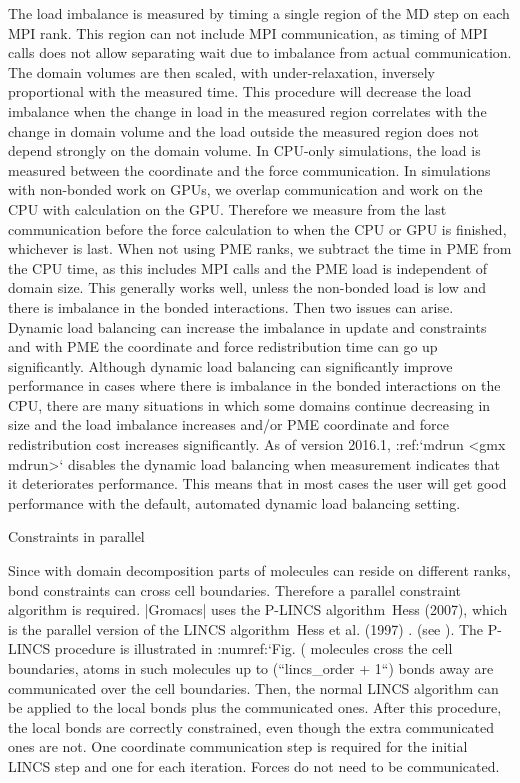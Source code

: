 {The load imbalance is measured by timing a single region of the MD step
on each MPI rank. This region can not include MPI communication, as
timing of MPI calls does not allow separating wait due to imbalance from
actual communication. The domain volumes are then scaled, with
under-relaxation, inversely proportional with the measured time. This
procedure will decrease the load imbalance when the change in load in
the measured region correlates with the change in domain volume and the
load outside the measured region does not depend strongly on the domain
volume. In CPU-only simulations, the load is measured between the
coordinate and the force communication. In simulations with non-bonded
work on GPUs, we overlap communication and work on the CPU with
calculation on the GPU. Therefore we measure from the last communication
before the force calculation to when the CPU or GPU is finished,
whichever is last. When not using PME ranks, we subtract the time in PME
from the CPU time, as this includes MPI calls and the PME load is
independent of domain size. This generally works well, unless the
non-bonded load is low and there is imbalance in the bonded
interactions. Then two issues can arise. Dynamic load balancing can
increase the imbalance in update and constraints and with PME the
coordinate and force redistribution time can go up significantly.
Although dynamic load balancing can significantly improve performance in
cases where there is imbalance in the bonded interactions on the CPU,
there are many situations in which some domains continue decreasing in
size and the load imbalance increases and/or PME coordinate and force
redistribution cost increases significantly. As of version 2016.1,
:ref:`mdrun <gmx mdrun>` disables the dynamic load balancing when
measurement indicates that it deteriorates performance. This means that
in most cases the user will get good performance with the default,
automated dynamic load balancing setting.

Constraints in parallel
~~~~~~~~~~~~~~~~~~~~~~~

Since with domain decomposition parts of molecules can reside on
different ranks, bond constraints can cross cell boundaries. Therefore a
parallel constraint algorithm is required. |Gromacs| uses the
P-LINCS
algorithm Hess (2007), which is the
parallel version of the LINCS
algorithm Hess
et al. (1997) . (see 
). The P-LINCS
procedure is illustrated in :numref:`Fig. (%
molecules cross the cell boundaries, atoms in such molecules up to
(``lincs_order + 1``) bonds away are communicated over the
cell boundaries. Then, the normal LINCS algorithm can be applied to the
local bonds plus the communicated ones. After this procedure, the local
bonds are correctly constrained, even though the extra communicated ones
are not. One coordinate communication step is required for the initial
LINCS step and one for each iteration. Forces do not need to be
communicated.

}
